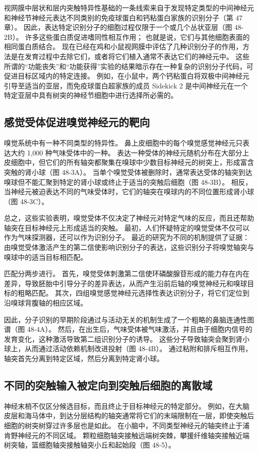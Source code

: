 视网膜中层状和层内突触特异性基础的一条线索来自于发现特定类型的中间神经元和神经节神经元表达不同类别的免疫球蛋白和钙粘蛋白家族的识别分子（第 47 章）。 因此，表达特定识别分子的细胞过程仅限于一个或几个丛状亚层（图 48-2B）。 许多这些蛋白质促进嗜同性相互作用； 也就是说，它们与其他细胞表面的相同蛋白质结合。 现在已经在鸡和小鼠视网膜中评估了几种识别分子的作用，方法是在发育过程中去除它们，或者将它们植入通常不表达它们的神经元中。 这些所谓的“功能丧失”和“功能获得”实验的结果暗示存在一种复杂的识别分子代码，可促进目标区域内的特定连接。 例如，在小鼠中，两个钙粘蛋白将双极中间神经元引导至适当的亚层，而免疫球蛋白超家族的成员 Sidekick 2 是中间神经元在一个特定亚层中具有树突的神经节细胞中进行选择所必需的。

\subsection{感觉受体促进嗅觉神经元的靶向}
嗅觉系统中有一种不同类型的特异性。 鼻上皮细胞中的每个嗅觉感觉神经元只表达大约 1,000 种气味受体中的一种。 表达一种受体的神经元随机分布在大部分上皮细胞中，但它们的所有轴突都聚集在嗅球中少数目标神经元的树突上，形成富含突触的肾小球（图 48-3A）。 当单个嗅觉受体被删除时，通常表达受体的轴突到达嗅球但不能汇聚到特定的肾小球或终止于适当的突触后细胞（图 48-3B）。 相反，当神经元被迫表达不同的气味受体时，它们的轴突在嗅球内的不同位置形成肾小球（图 48-3C）。

总之，这些实验表明，嗅觉受体不仅决定了神经元对特定气味的反应，而且还帮助轴突在目标神经元上形成适当的突触。 最初，人们怀疑特定的嗅觉受体不仅可以作为气味探测器，还可以作为识别分子。 最近的研究为不同的机制提供了证据：由嗅觉受体激活产生的第二信使影响识别分子的表达，这些识别分子将嗅觉轴突与嗅球中的适当目标相匹配。

匹配分两步进行。 首先，嗅觉受体刺激第二信使环磷酸腺苷形成的能力存在内在差异，导致胚胎中引导分子的差异表达，从而产生沿前后轴的嗅觉神经元和嗅球目标的粗略匹配。 其次，四组嗅觉感觉神经元选择性表达识别分子，将它们定位到沿嗅球背腹轴的相应区域。

因此，分子识别的早期阶段通过与活动无关的机制生成了一个粗略的鼻脑连通性图谱（图 48-4A）。 然后，在出生后，气味受体被气味激活，并且由于细胞内信号的发育变化，这种激活导致第二组识别分子的诱导。 这些分子导致轴突会聚到肾小球上，从而通过活动依赖机制改进投射（图 48-4B）。 通过粘附和排斥相互作用，轴突首先分离到特定区域，然后分离到特定肾小球。

\subsection{不同的突触输入被定向到突触后细胞的离散域}
神经末梢不仅区分候选目标，而且终止于目标神经元的特定部分。 例如，在大脑皮层和海马体中，到达分层结构的轴突通常将它们的末端限制在一层，即使突触后细胞的树突树穿过许多层也是如此。 在小脑中，不同类型神经元的轴突终止于浦肯野神经元的不同区域。 颗粒细胞轴突接触远端树突棘，攀援纤维轴突接触近端树突轴，篮细胞轴突接触轴突小丘和起始段（图 48-5）。

